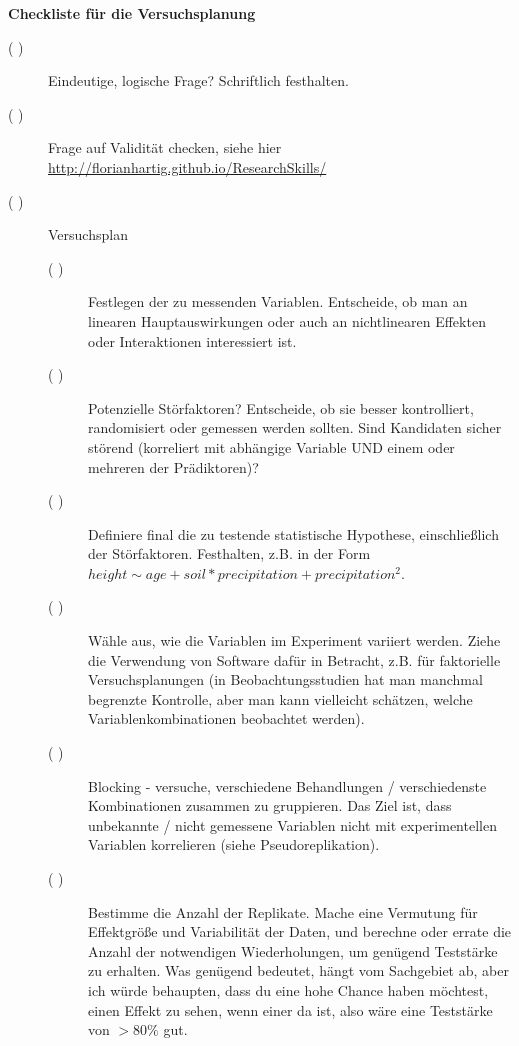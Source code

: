 \documentclass[a4paper,twoside]{tufte-book}\usepackage[]{graphicx}\usepackage[]{color}
\begin{document}
\newpage
\begin{fullwidth}
\begin{mdframed}[backgroundcolor=black!10,rightline=false,leftline=false]
    
\textbf{Checkliste für die Versuchsplanung}

\begin{description}

\item[( )] Eindeutige, logische Frage? Schriftlich festhalten.

\item[( )] Frage auf Validität checken, siehe hier \href{http://florianhartig.github.io/ResearchSkills/}{http://florianhartig.github.io/ResearchSkills/}

\item[( )] Versuchsplan

  \begin{description}

  \item[( )] Festlegen der zu messenden Variablen. Entscheide, ob man an linearen Hauptauswirkungen oder auch an nichtlinearen Effekten oder Interaktionen interessiert ist.
  
  \item[( )] Potenzielle Störfaktoren? Entscheide, ob sie besser kontrolliert, randomisiert oder gemessen werden sollten. Sind Kandidaten sicher störend (korreliert mit abhängige Variable UND einem oder mehreren der Prädiktoren)?
  
  \item[( )] Definiere final die zu testende statistische Hypothese, einschließlich der Störfaktoren. Festhalten, z.B. in der Form $height  \sim age + soil * precipitation + precipitation^2$. 
  
  \item[( )] Wähle aus, wie die Variablen im Experiment variiert werden. Ziehe die Verwendung von Software dafür in Betracht, z.B. für faktorielle Versuchsplanungen (in Beobachtungsstudien hat man manchmal begrenzte Kontrolle, aber man kann vielleicht schätzen, welche Variablenkombinationen beobachtet werden).
  
  \item[( )] Blocking - versuche, verschiedene Behandlungen / verschiedenste Kombinationen zusammen zu gruppieren. Das Ziel ist, dass unbekannte / nicht gemessene Variablen nicht mit experimentellen Variablen korrelieren (siehe Pseudoreplikation).
  
  \item[( )] Bestimme die Anzahl der Replikate. Mache eine Vermutung für Effektgröße und Variabilität der Daten, und berechne oder errate die Anzahl der notwendigen Wiederholungen, um genügend Teststärke zu erhalten. Was genügend bedeutet, hängt vom Sachgebiet ab, aber ich würde behaupten, dass du eine hohe Chance haben möchtest, einen Effekt zu sehen, wenn einer da ist, also wäre eine Teststärke von $>80\%$ gut.
  

\end{description}
\end{description}
\end{mdframed}
\end{fullwidth}
\end{document}
